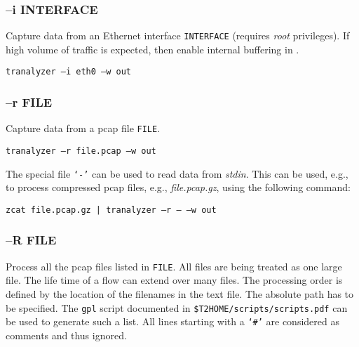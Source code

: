 \subsubsection{--i INTERFACE}
Capture data from an Ethernet interface {\tt INTERFACE} (requires {\em root} privileges).
If high volume of traffic is expected, then enable internal buffering in .

\begin{center}
    {\tt tranalyzer --i eth0 --w out}
\end{center}

\subsubsection{--r FILE}
Capture data from a pcap file {\tt FILE}.
\begin{center}
    {\tt tranalyzer --r file.pcap --w out}
\end{center}

The special file {\tt `-'} can be used to read data from {\em stdin}. This can be used, e.g., to process compressed pcap files, e.g., {\em file.pcap.gz}, using the following command:
\begin{center}
    {\tt zcat file.pcap.gz | tranalyzer --r -- --w out}
\end{center}

\subsubsection{--R FILE}
Process all the pcap files listed in {\tt FILE}. All files are being treated as one large file. The life time of a flow can extend over many files. The processing order is defined by the location of the filenames in the text file. The absolute path has to be specified. The {\tt gpl} script documented in {\tt \$T2HOME/scripts/scripts.pdf} can be used to generate such a list. All lines starting with a {\tt `\#'} are considered as comments and thus ignored.

\begin{figure}[!ht]
\centering
{}
\theverbbox
\end{figure}

